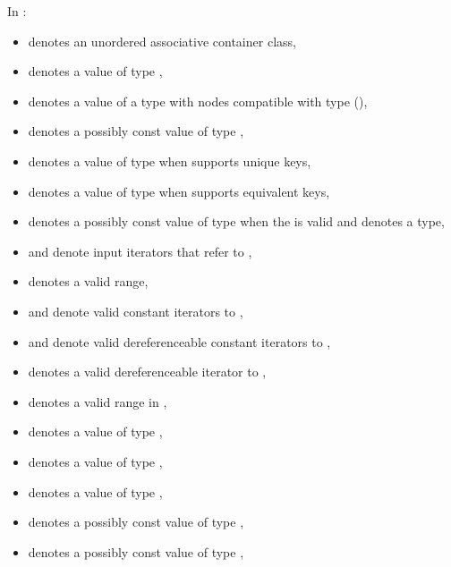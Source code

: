 \pnum
{}%
%
%
%
%
%
In :
\begin{itemize}
\item {} denotes an unordered associative container class,
\item {} denotes a value of type ,
\item {} denotes a value of a type with nodes compatible
  with type  (),
\item {} denotes a possibly const value of type ,
\item {} denotes a value of type 
  when  supports unique keys,
\item {} denotes a value of type 
  when  supports equivalent keys,
\item {} denotes a possibly const value of type 
  when the  
  is valid and denotes a type,
\item {} and  denote input iterators
  that refer to ,
\item \tcode{[i, j)} denotes a valid range,
\item {} and  denote valid constant iterators to ,
\item {} and  denote
  valid dereferenceable constant iterators to ,
\item {} denotes a valid dereferenceable iterator to ,
\item \tcode{[q1, q2)} denotes a valid range in ,
\item {} denotes a value of type ,
\item {} denotes a value of type ,
\item {} denotes a value of type ,
\item {} denotes a possibly const value of type ,
\item {} denotes a possibly const value of type ,

\end{itemize}
